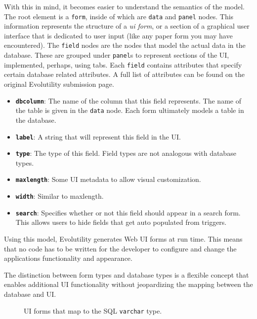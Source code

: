 With this in mind, it becomes easier to understand the semantics of the model.
The root element is a \texttt{form}, inside of which are \texttt{data} and
\texttt{panel} nodes. This information represents the structure of a \textit{ui
form}, or a section of a graphical user interface that is dedicated to user
input (like any paper form you may have encountered). The \texttt{field} nodes
are the nodes that model the actual data in the database. These are grouped
under \texttt{panel}s to represent sections of the UI, implemented, perhaps,
using tabs. Each \texttt{field} contains attributes that specify certain
database related attributes. A full list of attributes can be found on the
original Evolutility submission page\cite{giulieri_minimalist_2011}.

\begin{itemize}
\item \textbf{\texttt{dbcolumn}}: The name of the column that this field represents. The name of the table is given in the \texttt{data} node. Each form ultimately models a table in the database.
\item \textbf{\texttt{label}}: A string that will represent this field in the UI.
\item \textbf{\texttt{type}}: The type of this field. Field types are not analogous with database types.
\item \textbf{\texttt{maxlength}}: Some UI metadata to allow visual customization. 
\item \textbf{\texttt{width}}: Similar to maxlength.
\item \textbf{\texttt{search}}: Specifies whether or not this field should appear in a search form. This allows users to hide fields that get auto populated from triggers.
\end{itemize}

Using this model, Evolutility generates Web UI forms at run time. This means
that no code has to be written for the developer to configure and change the
applications functionality and appearance. 

The distinction between form types and database types is a flexible concept that
enables additional UI functionality without jeopardizing the mapping between the
database and UI. 

\begin{figure}[h!]
\centering
{}
\caption{UI forms that map to the SQL \texttt{varchar} type.}
\label{fig:varchar_map}
\end{figure}


